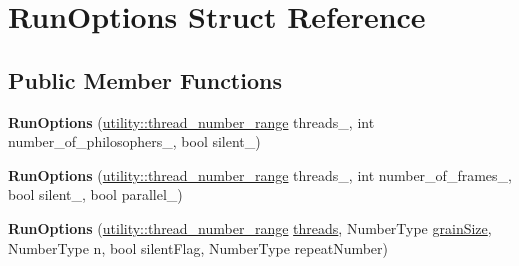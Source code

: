 \hypertarget{structRunOptions}{}\section{Run\+Options Struct Reference}
\label{structRunOptions}
\subsection*{Public Member Functions}
\begin{DoxyCompactItemize}
\item 
\hypertarget{structRunOptions_a2d8e9436670b7e5c9a6b7b7d5f18e012}{}{\bfseries Run\+Options} (\hyperlink{structutility_1_1thread__number__range}{utility\+::thread\+\_\+number\+\_\+range} threads\+\_\+, int number\+\_\+of\+\_\+philosophers\+\_\+, bool silent\+\_\+)\label{structRunOptions_a2d8e9436670b7e5c9a6b7b7d5f18e012}

\item 
\hypertarget{structRunOptions_aa109802f2ffabce7ac8ea27468355346}{}{\bfseries Run\+Options} (\hyperlink{structutility_1_1thread__number__range}{utility\+::thread\+\_\+number\+\_\+range} threads\+\_\+, int number\+\_\+of\+\_\+frames\+\_\+, bool silent\+\_\+, bool parallel\+\_\+)\label{structRunOptions_aa109802f2ffabce7ac8ea27468355346}

\item 
\hypertarget{structRunOptions_ade9f68541b532c34fbfaf56be3776ec0}{}{\bfseries Run\+Options} (\hyperlink{structutility_1_1thread__number__range}{utility\+::thread\+\_\+number\+\_\+range} \hyperlink{structRunOptions_aaec23c1325e3da318e63d168a606e7e8}{threads}, Number\+Type \hyperlink{structRunOptions_a59c112fa7b3e61243306255fb1c9e56c}{grain\+Size}, Number\+Type n, bool silent\+Flag, Number\+Type repeat\+Number)\label{structRunOptions_ade9f68541b532c34fbfaf56be3776ec0}

\end{DoxyCompactItemize}
